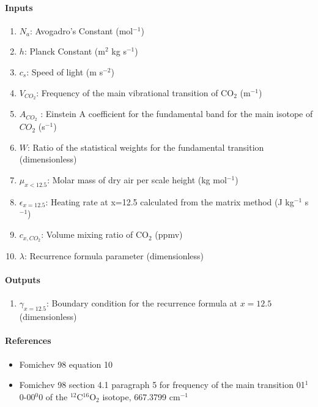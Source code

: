    \paragraph{Inputs}
   \begin{enumerate}
   \item $N_a$: Avogadro's Constant (mol$^{-1}$)
   \item $h$: Planck Constant (m$^2$ kg s$^{-1}$)
   \item $c_s$: Speed of light (m s$^{-2}$)
   \item $V_{CO_2}$: Frequency of the main vibrational transition of CO$_2$ 
     (m$^{-1}$)
   \item $A_{CO_2}$ : Einstein A coefficient for the fundamental band for the 
     main isotope of $CO_2$ (s$^{-1}$)
   \item $W$: Ratio of the statistical weights for the fundamental transition 
     (dimensionless)
   \item $\mu_{x<12.5}$: Molar mass of dry air per scale height (kg mol$^{-1}$)
   \item $\epsilon_{x=12.5}$: Heating rate at x=12.5 calculated from the 
     matrix method (J kg$^{-1}$ s$^{-1}$)
   \item $c_{x,CO_2}$: Volume mixing ratio of CO$_2$ (ppmv)
   \item $\lambda$: Recurrence formula parameter (dimensionless) 
   \end{enumerate}

   \paragraph{Outputs}
   \begin{enumerate}
   \item $\gamma_{x=12.5}$: Boundary condition for the recurrence formula 
     at $x = 12.5$ (dimensionless)
   \end{enumerate}

   \paragraph{References}
   \begin{itemize}
   \item Fomichev 98 equation 10
   \item Fomichev 98 section 4.1 paragraph 5 for frequency of the main
     transition 01$^1$0-00$^0$0 of the ${}^{12}$C$^{16}$O$_2$ isotope, 
     667.3799 cm$^{-1}$
   \end{itemize}

